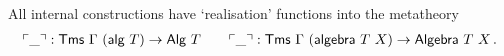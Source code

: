 All internal constructions have `realisation' functions into the metatheory
\begin{align*}
    \ulcorner \_ \urcorner : \textsf{Tms}\ \Gamma\ (\textsf{alg}\ T) \to \textsf{Alg}\ T \qquad \ulcorner \_ \urcorner : \textsf{Tms}\ \Gamma\ (\textsf{algebra}\ T\ X) \to \textsf{Algebra}\ T\ X \,.
\end{align*}


